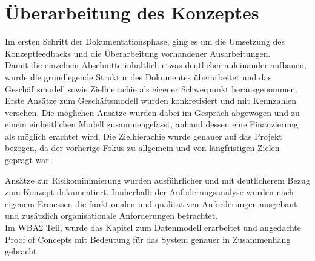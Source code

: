 
\chapter{Überarbeitung des Konzeptes}
Im ersten Schritt der Dokumentationsphase, ging es um die Umsetzung des Konzeptfeedbacks und die Überarbeitung vorhandener Ausarbeitungen.\\
Damit die einzelnen Abschnitte inhaltlich etwas deutlicher aufeinander aufbauen, wurde die grundlegende Struktur des Dokumentes überarbeitet und das Geschäftsmodell sowie Zielhierachie als eigener Schwerpunkt herausgenommen.
Erste Ansätze zum Geschäftsmodell wurden konkretisiert und mit Kennzahlen versehen. Die möglichen Ansätze wurden dabei im Gespräch abgewogen und zu einem einheitlichen Modell zusammengefasst, anhand dessen eine Finanzierung als möglich erachtet wird. Die Zielhierachie wurde genauer auf das Projekt bezogen, da der vorherige Fokus zu allgemein und von langfristigen Zielen geprägt war.

Ansätze zur Risikominimierung wurden ausführlicher und mit deutlicherem Bezug zum Konzept dokumentiert. Innherhalb der Anfoderungsanalyse wurden nach eigenem Ermessen die funktionalen und qualitativen Anforderungen ausgebaut und zusätzlich organisationale Anforderungen betrachtet.\\

Im WBA2 Teil, wurde das Kapitel zum Datenmodell erarbeitet und angedachte Proof of Concepts mit Bedeutung für das System genauer in Zusammenhang gebracht.


